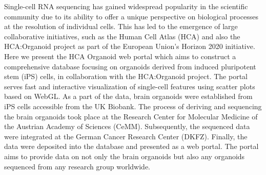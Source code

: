 \noindent
Single-cell RNA sequencing has gained widespread popularity in the scientific community due to its ability to offer a unique perspective on biological processes at the resolution of individual cells. This has led to the emergence of large collaborative initiatives, such as the Human Cell Atlas (HCA) and also the HCA:Organoid project as part of the European Union's Horizon 2020 initiative. Here we present the HCA Organoid web portal which aims to construct a comprehensive database focusing on organoids derived from induced pluripotent stem (iPS) cells, in collaboration with the HCA:Organoid project. The portal serves fast and interactive visualization of single-cell features using scatter plots based on WebGL. As a part of the data, brain organoids were established from iPS cells accessible from the UK Biobank. The process of deriving and sequencing the brain organoids took place at the Research Center for Molecular Medicine of the Austrian Academy of Sciences (CeMM). Subsequently, the sequenced data were integrated at the German Cancer Research Center (DKFZ). Finally, the data were deposited into the database and presented as a web portal. The portal aims to provide data on not only the brain organoids but also any organoids sequenced from any research group worldwide.
\newpage


